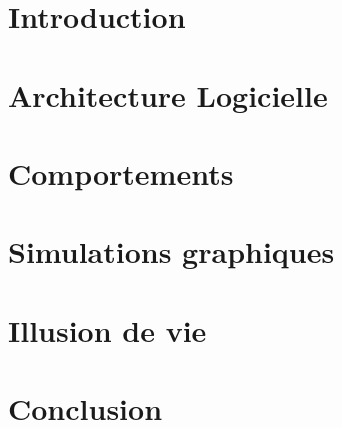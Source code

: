\documentclass[a4paper,12pt]{article}
\begin{document}

\clearpage
\tableofcontents
\clearpage

\section{Introduction}


\section{Architecture Logicielle}


\section{Comportements}


\section{Simulations graphiques}


\section{Illusion de vie}


\section{Conclusion}

\end{document}
